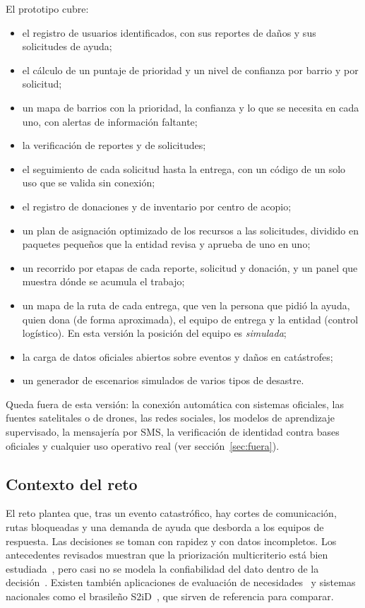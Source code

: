 El prototipo cubre:
\begin{itemize}
  \item el registro de usuarios identificados, con sus reportes de daños y sus solicitudes de ayuda;
  \item el cálculo de un puntaje de prioridad y un nivel de confianza por barrio y por solicitud;
  \item un mapa de barrios con la prioridad, la confianza y lo que se necesita en cada uno, con alertas de información faltante;
  \item la verificación de reportes y de solicitudes;
  \item el seguimiento de cada solicitud hasta la entrega, con un código de un solo uso que se valida sin conexión;
  \item el registro de donaciones y de inventario por centro de acopio;
  \item un plan de asignación optimizado de los recursos a las solicitudes, dividido en paquetes pequeños que la entidad revisa y aprueba de uno en uno;
  \item un recorrido por etapas de cada reporte, solicitud y donación, y un panel que muestra dónde se acumula el trabajo;
  \item un mapa de la ruta de cada entrega, que ven la persona que pidió la ayuda, quien dona (de forma aproximada), el equipo de entrega y la entidad (control logístico). En esta versión la posición del equipo es \emph{simulada};
  \item la carga de datos oficiales abiertos sobre eventos y daños en catástrofes;
  \item un generador de escenarios simulados de varios tipos de desastre.
\end{itemize}

Queda fuera de esta versión: la conexión automática con sistemas oficiales, las fuentes satelitales o de drones, las redes sociales, los modelos de aprendizaje supervisado, la mensajería por SMS, la verificación de identidad contra bases oficiales y cualquier uso operativo real (ver sección~\ref{sec:fuera}).

\subsection{Contexto del reto}
El reto plantea que, tras un evento catastrófico, hay cortes de comunicación, rutas bloqueadas y una demanda de ayuda que desborda a los equipos de respuesta. Las decisiones se toman con rapidez y con datos incompletos. Los antecedentes revisados muestran que la priorización multicriterio está bien estudiada~\cite{Sahin2023314,Chakraborty2016308}, pero casi no se modela la confiabilidad del dato dentro de la decisión~\cite{Suarez2022443,Fan2020}. Existen también aplicaciones de evaluación de necesidades~\cite{Montefalcon202154} y sistemas nacionales como el brasileño S2iD~\cite{Eckhardt2018}, que sirven de referencia para comparar.

